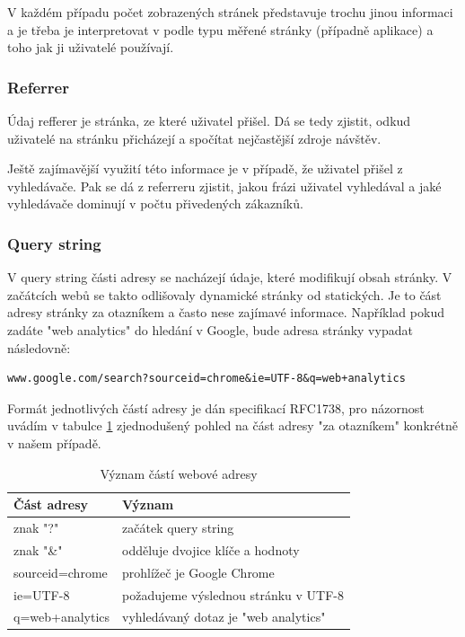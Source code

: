 \documentclass[bc,male,java,dept456]{diploma}						%
\begin{document}
V každém případu počet zobrazených stránek představuje trochu jinou informaci a je třeba je interpretovat v podle typu měřené stránky (případně aplikace) a toho jak ji uživatelé používají.

\subsubsection{Referrer}

Údaj refferer je stránka, ze které uživatel přišel. Dá se tedy zjistit, odkud uživatelé na stránku přicházejí a spočítat nejčastější zdroje návštěv.

Ještě zajímavější využití této informace je v případě, že uživatel přišel z vyhledávače. Pak se dá z referreru zjistit, jakou frázi uživatel vyhledával a jaké vyhledávače dominují v počtu přivedených zákazníků.

\subsubsection{Query string}

V query string části adresy se nacházejí údaje, které modifikují obsah stránky. V začátcích webů se takto odlišovaly dynamické stránky od statických. Je to část adresy stránky za otazníkem a často nese zajímavé informace. Například pokud zadáte "web analytics" do hledání v Google, bude adresa stránky vypadat následovně:

\begin{lstlisting}[label=src:Plain,caption=Adresa ve vyhledávači pro dotaz web analytics, label=lala]
www.google.com/search?sourceid=chrome&ie=UTF-8&q=web+analytics
\end{lstlisting}

Formát jednotlivých částí adresy je dán specifikací RFC1738\cite{url}, pro názornost uvádím v tabulce \ref{table:web_address_meaning} zjednodušený pohled na část adresy "za otazníkem" konkrétně v našem případě.

\begin{table}
	\centering
	\begin{tabular}{ll}
	Část adresy & Význam \\	\hline \smallskip
	znak "?" & začátek query string \\ \smallskip
	znak "\&" & odděluje dvojice klíče a hodnoty \\ \smallskip
	sourceid=chrome & prohlížeč je Google Chrome \\ \smallskip
	ie=UTF-8 & požadujeme výslednou stránku v UTF-8 \\ \smallskip
	q=web+analytics & vyhledávaný dotaz je "web analytics"
\end{tabular}
	\caption{Význam částí webové adresy}	
	\label{table:web_address_meaning}	
\end{table}
\end{document}

